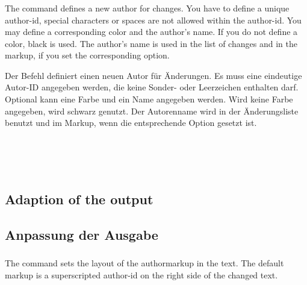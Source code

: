 \subsubsection{}
\ifENGLISH
The command  defines a new author for changes.
You have to define a unique author-id, special characters or spaces are not allowed within the author-id.
You may define a corresponding color and the author's name.
If you do not define a color, black is used.
The author's name is used in the list of changes and in the markup, if you set the corresponding option.
\begin{chusage}
	\>
\end{chusage}
\fi
\ifGERMAN
	Der Befehl  definiert einen neuen Autor für Änderungen.
	Es muss eine eindeutige Autor-ID angegeben werden, die keine Sonder- oder Leerzeichen enthalten darf.
	Optional kann eine Farbe und ein Name angegeben werden.
	Wird keine Farbe angegeben, wird schwarz genutzt.
	Der Autorenname wird in der Änderungsliste benutzt und im Markup, wenn die entsprechende Option gesetzt ist.
	\begin{chusage}
		\>
	\end{chusage}
\fi
\begin{chusage}[true]
\>\\
\>\\
\>\\
\>
\end{chusage}

\ifENGLISH
\subsection{Adaption of the output}
\fi
\ifGERMAN
	\subsection{Anpassung der Ausgabe}
\fi

\subsubsection{}
\DescribeMacro{\setauthormarkup}
\ifENGLISH
The command  sets the layout of the authormarkup in the text.
The default markup is a superscripted author-id on the right side of the changed text.

